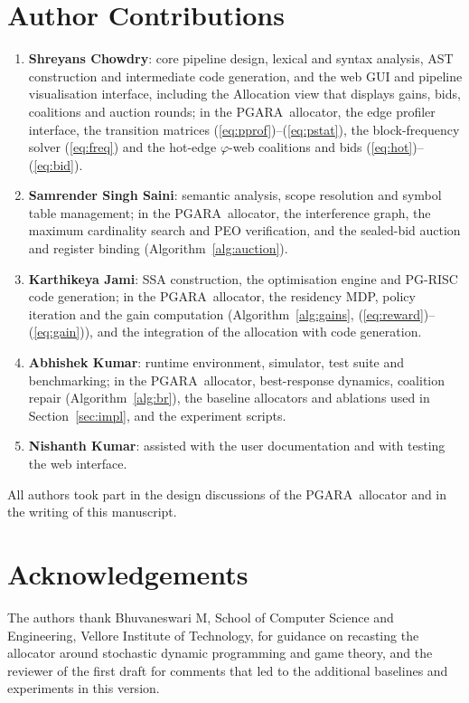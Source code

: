 \documentclass{ieeeaccess}
\newcommand{\MG}{PGARA}
\begin{document}
\section*{Author Contributions}

\begin{enumerate}
\item \textbf{Shreyans Chowdry}: core pipeline design, lexical and
syntax analysis, AST construction and intermediate code generation, and
the web GUI and pipeline visualisation interface, including the
Allocation view that displays gains, bids, coalitions and auction
rounds; in the \MG\ allocator, the edge profiler interface, the transition
matrices (\ref{eq:pprof})--(\ref{eq:pstat}), the block-frequency
solver (\ref{eq:freq}) and the hot-edge $\varphi$-web coalitions and
bids (\ref{eq:hot})--(\ref{eq:bid}).
\item \textbf{Samrender Singh Saini}: semantic analysis, scope
resolution and symbol table management; in the \MG\ allocator, the
interference graph, the maximum cardinality search and PEO
verification, and the sealed-bid auction and register binding
(Algorithm~\ref{alg:auction}).
\item \textbf{Karthikeya Jami}: SSA construction, the optimisation
engine and PG-RISC code generation; in the \MG\ allocator, the residency
MDP, policy iteration and the gain computation
(Algorithm~\ref{alg:gains}, (\ref{eq:reward})--(\ref{eq:gain})), and the
integration of the allocation with code generation.
\item \textbf{Abhishek Kumar}: runtime environment, simulator, test
suite and benchmarking; in the \MG\ allocator, best-response dynamics,
coalition repair (Algorithm~\ref{alg:br}), the baseline allocators and
ablations used in Section~\ref{sec:impl}, and the experiment scripts.
\item \textbf{Nishanth Kumar}: assisted with the user documentation and
with testing the web interface.
\end{enumerate}
All authors took part in the design discussions of the \MG\ allocator
and in the writing of this manuscript.

\section*{Acknowledgements}
The authors thank Bhuvaneswari M, School of Computer Science and
Engineering, Vellore Institute of Technology, for guidance on
recasting the allocator around stochastic dynamic programming and game
theory, and the reviewer of the first draft for comments that led to
the additional baselines and experiments in this version.
\end{document}

